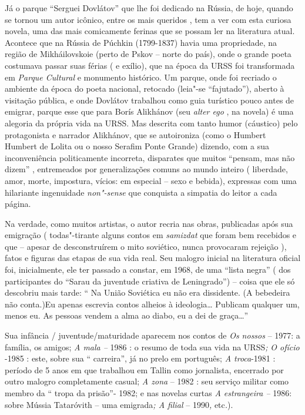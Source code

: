 Já o parque ``Serguei Dovlátov'' que lhe foi dedicado na Rússia, de
hoje, quando se tornou um autor icônico, entre os mais queridos , tem a
ver com esta curiosa novela, uma das mais comicamente ferinas que se
possam ler na literatura atual. Acontece que na Rússia de Púchkin
(1799-1837) havia uma propriedade, na região de Mikháilovskoie (perto de
Pskov -- norte do país), onde o grande poeta costumava passar suas
férias ( e exílio), que na época da URSS foi transformada em
\emph{Parque Cultural} e monumento histórico. Um parque, onde foi
recriado o ambiente da época do poeta nacional, retocado (leia"-se
``fajutado''), aberto à visitação pública, e onde Dovlátov trabalhou
como guia turístico pouco antes de emigrar, parque esse que para Borís
Alikhánov (seu \emph{alter ego} , na novela) é uma alegoria da própria
vida na URSS. Mas descrita com tanto humor (cáustico) pelo protagonista
e narrador Alikhánov, que se autoironiza (como o Humbert Humbert de
Lolita ou o nosso Serafim Ponte Grande) dizendo, com a sua
inconveniência politicamente incorreta, disparates que muitos ``pensam,
mas não dizem'' , entremeados por generalizações comuns ao mundo inteiro
( liberdade, amor, morte, impostura, vícios: em especial -- sexo e
bebida), expressas com uma hilariante ingenuidade \emph{non"-sense} que
conquista a simpatia do leitor a cada página.

Na verdade, como muitos artistas, o autor recria nas obras, publicadas
após sua emigração ( todas"-tirante alguns contos em \emph{samizdat} que
foram bem recebidos e que -- apesar de desconstruírem o mito soviético,
nunca provocaram rejeição ), fatos e figuras das etapas de sua vida
real. Seu malogro inicial na literatura oficial foi, inicialmente, ele
ter passado a constar, em 1968, de uma ``lista negra'' ( dos
participantes do ``Sarau da juventude criativa de Leningrado'') -- coisa
que ele só descobriu mais tarde: `` Na União Soviética eu não era
dissidente. (A bebedeira não conta.)Eu apenas escrevia contos alheios à
ideologia\ldots{} Publicam qualquer um, menos eu. As pessoas vendem a alma ao
diabo, eu a dei de graça\ldots{}''

Sua infância / juventude/maturidade aparecem nos contos de \emph{Os
nossos} -- 1977: a família, os amigos; \emph{A mala --} 1986 : o resumo
de toda sua vida na URSS\emph{;} \emph{O ofício} -1985 : este, sobre sua
`` carreira'', já no prelo em português; \emph{A troca}-1981 : período
de 5 anos em que trabalhou em Tallin como jornalista, encerrado por
outro malogro completamente casual; \emph{A zona} -- 1982 : seu serviço
militar como membro da `` tropa da prisão''- 1982; e nas novelas curtas
\emph{A estrangeira --} 1986: sobre Mússia Tataróvith -- uma
emigrada\emph{; A filial} -- 1990\emph{,} etc\emph{.}).

